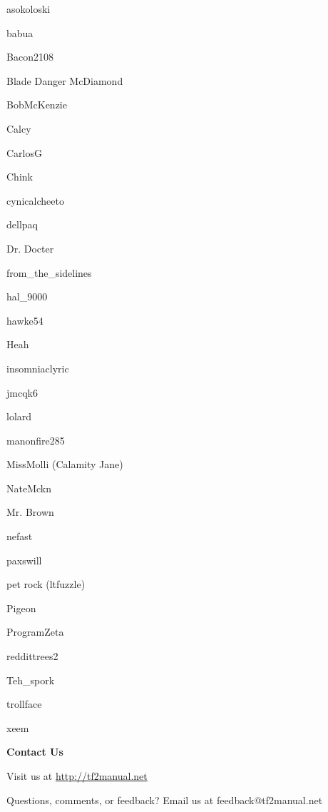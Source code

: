 \begin{multicols}{3}
asokoloski

babua

Bacon2108

Blade Danger McDiamond

BobMcKenzie

Calcy

CarlosG

Chink

cynicalcheeto

dellpaq

Dr. Docter

from\_the\_sidelines

hal\_9000

hawke54

Heah

insomniaclyric

jmcqk6

lolard

manonfire285

MissMolli (Calamity Jane)

NateMckn

Mr. Brown

nefast

paxswill

pet rock (ltfuzzle)

Pigeon

ProgramZeta

reddittrees2

Teh\_spork

trollface

xeem
 
\end{multicols}
\newpage %
{\bf Contact Us}

Visit us at \url{http://tf2manual.net}

Questions, comments, or feedback? Email us at feedback@tf2manual.net